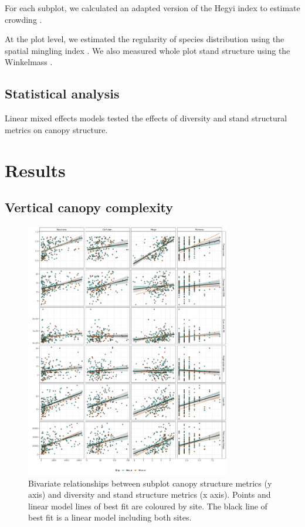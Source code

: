 \documentclass[11pt,a4paper]{article}
\begin{document}
For each subplot, we calculated an adapted version of the Hegyi index to estimate crowding \citep{Hegyi1974}.

At the plot level, we estimated the regularity of species distribution using the spatial mingling index \citep{Gadow}. We also measured whole plot stand structure using the Winkelmass \citep{}.

\subsection{Statistical analysis}

Linear mixed effects models tested the effects of diversity and stand structural metrics on canopy structure.

\section{Results}

\subsection{Vertical canopy complexity}

\begin{figure}[H]
\centering
	\includegraphics[width=0.8\textwidth]{subplot_canopy_bivar}
	\caption{Bivariate relationships between subplot canopy structure metrics (y axis) and diversity and stand structure metrics (x axis). Points and linear model lines of best fit are coloured by site. The black line of best fit is a linear model including both sites.}
	\label{subplot_canopy_bivar}
\end{figure}
\end{document}
